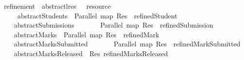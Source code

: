 \isamarkupfalse%
\ refinement\ {\isacharcolon}{\isacharcolon}\ {\isachardoublequoteopen}abstract{\isachardot}lres\ {\isasymRightarrow}\ \ resource{\isachardoublequoteclose}\isanewline
\ \ \isanewline
\ \ \ \ {\isachardoublequoteopen}\ abstract{\isachardot}Students\ {\isacharequal}\ Parallel\ {\isacharparenleft}map\ {\isacharparenleft}Res\ {\isasymcirc}\ refined{\isachardot}Student{\isacharparenright}\ \isanewline
\ \ {\isacharbar}\ {\isachardoublequoteopen}\ abstract{\isachardot}Submissions\ {\isacharequal}\isanewline
\ \ \ \ \ \ Parallel\ {\isacharparenleft}map\ {\isacharparenleft}Res\ {\isasymcirc}\ refined{\isachardot}Submission{\isacharparenright}\ \isanewline
\ \ {\isacharbar}\ {\isachardoublequoteopen}\ abstract{\isachardot}Marks\ {\isacharequal}\ Parallel\ {\isacharparenleft}map\ {\isacharparenleft}Res\ {\isasymcirc}\ refined{\isachardot}Mark{\isacharparenright}\ \isanewline
\ \ {\isacharbar}\ {\isachardoublequoteopen}\ abstract{\isachardot}MarksSubmitted\ {\isacharequal}\isanewline
\ \ \ \ \ \ Parallel\ {\isacharparenleft}map\ {\isacharparenleft}Res\ {\isasymcirc}\ refined{\isachardot}MarkSubmitted{\isacharparenright}\ \isanewline
\ \ {\isacharbar}\ {\isachardoublequoteopen}\ abstract{\isachardot}MarksReleased\ {\isacharequal}\ Res\ refined{\isachardot}MarksReleased{\isachardoublequoteclose}%
